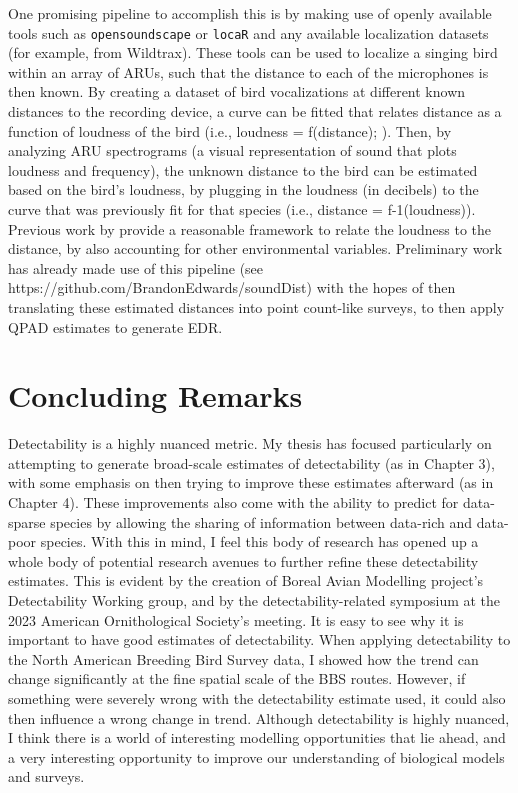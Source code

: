 \par One promising pipeline to accomplish this is by making use of openly available tools such as \texttt{opensoundscape} \citep{lapp_opensoundscape_2023} or \texttt{locaR} \citep{becker_locar_2023} and any available localization datasets (for example, from Wildtrax).
These tools can be used to localize a singing bird within an array of ARUs, such that the distance to each of the microphones is then known.
By creating a dataset of bird vocalizations at different known distances to the recording device, a curve can be fitted that relates distance as a function of loudness of the bird (i.e., loudness = f(distance); \citet{sebastian-gonzalez_density_2018, yip_sound_2020}). 
Then, by analyzing ARU spectrograms (a visual representation of sound that plots loudness and frequency), the unknown distance to the bird can be estimated based on the bird’s loudness, by plugging in the loudness (in decibels) to the curve that was previously fit for that species (i.e., distance = f-1(loudness)). 
Previous work by \citet{haupert_physicsbased_2023} provide a reasonable framework to relate the loudness to the distance, by also accounting for other environmental variables.
Preliminary work has already made use of this pipeline (see https://github.com/BrandonEdwards/soundDist) with the hopes of then translating these estimated distances into point count-like surveys, to then apply QPAD estimates to generate EDR.


\section{Concluding Remarks}
\par Detectability is a highly nuanced metric.
My thesis has focused particularly on attempting to generate broad-scale estimates of detectability (as in Chapter 3), with some emphasis on then trying to improve these estimates afterward (as in Chapter 4).
These improvements also come with the ability to predict for data-sparse species by allowing the sharing of information between data-rich and data-poor species.
With this in mind, I feel this body of research has opened up a whole body of potential research avenues to further refine these detectability estimates.
This is evident by the creation of Boreal Avian Modelling project's Detectability Working group, and by the detectability-related symposium at the 2023 American Ornithological Society's meeting.
It is easy to see why it is important to have good estimates of detectability.
When applying detectability to the North American Breeding Bird Survey data, I showed how the trend can change significantly at the fine spatial scale of the BBS routes.
However, if something were severely wrong with the detectability estimate used, it could also then influence a wrong change in trend.
Although detectability is highly nuanced, I think there is a world of interesting modelling opportunities that lie ahead, and a very interesting opportunity to improve our understanding of biological models and surveys.

